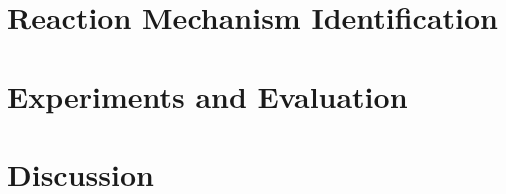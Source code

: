 \documentclass{article}
\begin{document}





\section{Reaction Mechanism Identification}




\section{Experiments and Evaluation}


%





\section{Discussion}









\end{document}
